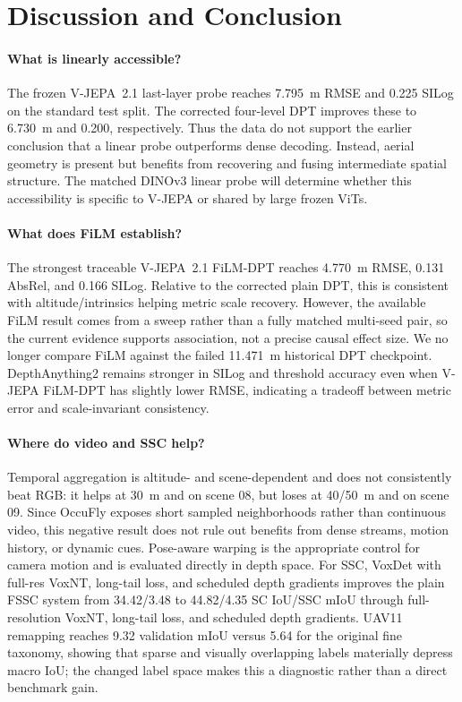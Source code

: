 \section{Discussion and Conclusion}
\label{sec:discussion_conclusion}

\paragraph{What is linearly accessible?}
The frozen V-JEPA~2.1 last-layer probe reaches 7.795~m RMSE and 0.225 SILog on the standard test split. The corrected four-level DPT improves these to 6.730~m and 0.200, respectively. Thus the data do not support the earlier conclusion that a linear probe outperforms dense decoding. Instead, aerial geometry is present but benefits from recovering and fusing intermediate spatial structure. The matched DINOv3 linear probe will determine whether this accessibility is specific to V-JEPA or shared by large frozen ViTs.

\paragraph{What does FiLM establish?}
The strongest traceable V-JEPA~2.1 FiLM-DPT reaches 4.770~m RMSE, 0.131 AbsRel, and 0.166 SILog. Relative to the corrected plain DPT, this is consistent with altitude/intrinsics helping metric scale recovery. However, the available FiLM result comes from a sweep rather than a fully matched multi-seed pair, so the current evidence supports association, not a precise causal effect size. We no longer compare FiLM against the failed 11.471~m historical DPT checkpoint. DepthAnything2 remains stronger in SILog and threshold accuracy even when V-JEPA FiLM-DPT has slightly lower RMSE, indicating a tradeoff between metric error and scale-invariant consistency.

\paragraph{Where do video and SSC help?}
Temporal aggregation is altitude- and scene-dependent and does not consistently beat RGB: it helps at 30~m and on scene 08, but loses at 40/50~m and on scene 09. Since OccuFly exposes short sampled neighborhoods rather than continuous video, this negative result does not rule out benefits from dense streams, motion history, or dynamic cues. Pose-aware warping is the appropriate control for camera motion and is evaluated directly in depth space. For SSC, VoxDet with full-res VoxNT, long-tail loss, and scheduled depth gradients improves the plain FSSC system from 34.42/3.48 to 44.82/4.35 SC IoU/SSC mIoU through full-resolution VoxNT, long-tail loss, and scheduled depth gradients. UAV11 remapping reaches 9.32 validation mIoU versus 5.64 for the original fine taxonomy, showing that sparse and visually overlapping labels materially depress macro IoU; the changed label space makes this a diagnostic rather than a direct benchmark gain.


